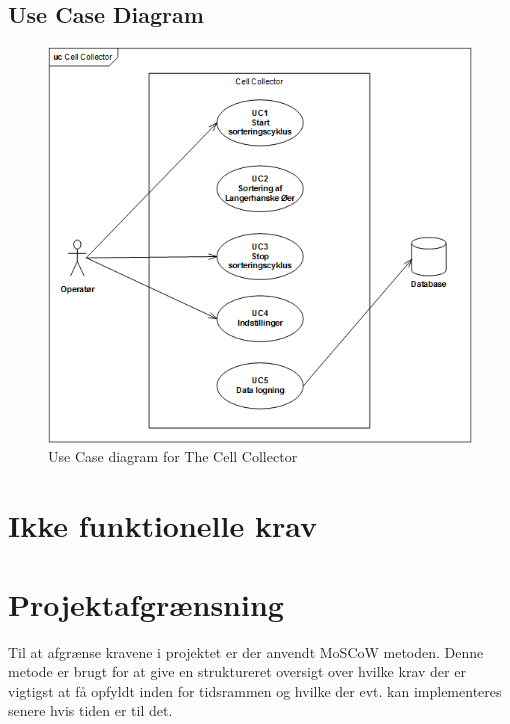 \subsection{Use Case Diagram}
\begin{figure}[H]
	\centering
	\includegraphics[width=1\textwidth]{billeder/UC_CellCollector.png}
	\caption{Use Case diagram for The Cell Collector}
	\label{fig:usecase}
\end{figure}
\newpage






\section{Ikke funktionelle krav}


\newpage

\newpage
\section{Projektafgrænsning}
Til at afgrænse kravene i projektet er der anvendt MoSCoW metoden. Denne metode er brugt for at give en struktureret oversigt over hvilke krav der er vigtigst at få opfyldt inden for tidsrammen og hvilke der evt. kan implementeres senere hvis tiden er til det.

